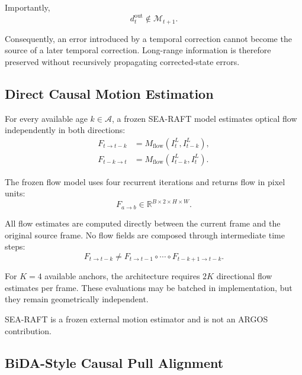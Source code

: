 \documentclass[11pt,a4paper]{article}
\begin{document}
Importantly,
%
\begin{equation}
d_t^{\mathrm{out}}
\notin
\mathcal{M}_{t+1}.
\label{eq:no_fused_writeback}
\end{equation}

Consequently, an error introduced by a temporal correction cannot become
the source of a later temporal correction. Long-range information is
therefore preserved without recursively propagating corrected-state
errors.

\subsection{Direct Causal Motion Estimation}
\label{sec:motion_estimation}

For every available age \(k\in\mathcal{A}\), a frozen SEA-RAFT model
estimates optical flow independently in both directions:
%
\begin{align}
F_{t\rightarrow t-k}
&=
M_{\mathrm{flow}}
\left(
I_t^L,
I_{t-k}^L
\right),
\label{eq:current_to_anchor_flow}
\\
F_{t-k\rightarrow t}
&=
M_{\mathrm{flow}}
\left(
I_{t-k}^L,
I_t^L
\right).
\label{eq:anchor_to_current_flow}
\end{align}

The frozen flow model uses four recurrent iterations and returns flow in
pixel units:
%
\begin{equation}
F_{a\rightarrow b}
\in
\mathbb{R}^{B\times2\times H\times W}.
\end{equation}

All flow estimates are computed directly between the current frame and
the original source frame. No flow fields are composed through
intermediate time steps:
%
\begin{equation}
F_{t\rightarrow t-k}
\neq
F_{t\rightarrow t-1}
\circ
\cdots
\circ
F_{t-k+1\rightarrow t-k}.
\end{equation}

For \(K=4\) available anchors, the architecture requires \(2K\)
directional flow estimates per frame. These evaluations may be batched
in implementation, but they remain geometrically independent.

SEA-RAFT is a frozen external motion estimator and is not an ARGOS
contribution.

\subsection{BiDA-Style Causal Pull Alignment}
\label{sec:pull_alignment}
\end{document}
